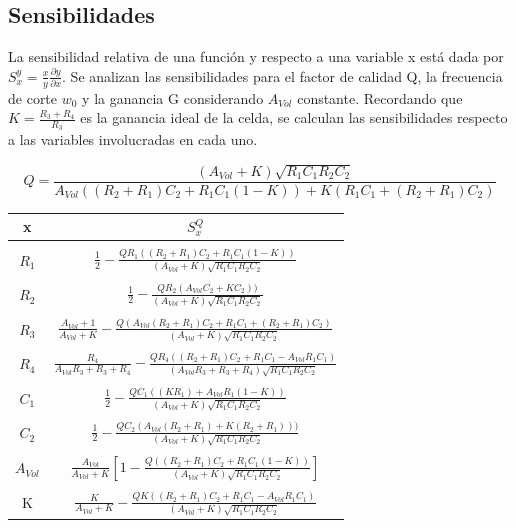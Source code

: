 \subsection{Sensibilidades}

La sensibilidad relativa de una función y respecto a una variable x está dada por $S^{y}_{x} = \frac{x}{y}\frac{\partial y}{\partial x}$. Se analizan las sensibilidades para el factor de calidad Q, la frecuencia de corte $w_{0}$ y la ganancia G considerando $A_{Vol}$ constante. Recordando que $K = \frac{R_{3}+R_{4}}{R_{3}}$ es la ganancia ideal de la celda, se calculan las sensibilidades respecto a las variables involucradas en cada uno. 

$$Q = \frac{(A_{Vol}+K)\sqrt{R_{1}C_{1}R_{2}C_{2}}}{A_{Vol}((R_{2}+R_{1})C_{2}+R_{1}C_{1}(1-K))+K(R_{1}C_{1}+(R_{2}+R_{1})C_{2})} $$

\begin{table}[H]
\centering
\begin{tabular}{c|c}
x         & $S^{Q}_{x}$                                                                                                                                             \\ \hline
\\
$R_{1}$   & $\frac{1}{2} - \frac{QR_{1}((R_{2}+R_{1})C_{2}+R_{1}C_{1}(1-K))}{(A_{Vol}+K)\sqrt{R_{1}C_{1}R_{2}C_{2}}}$           
\\
\\
$R_{2}$   & $\frac{1}{2} - \frac{QR_{2}(A_{Vol}C_{2}+KC_{2}))}{(A_{Vol}+K)\sqrt{R_{1}C_{1}R_{2}C_{2}}}$                                                  
\\
\\
$R_{3}$   & $\frac{A_{Vol}+1}{A_{Vol}+K} - \frac{Q(A_{Vol}(R_{2}+R_{1})C_{2}+R_{1}C_{1}+(R_{2}+R_{1})C_{2})}{(A_{Vol}+K)\sqrt{R_{1}C_{1}R_{2}C_{2}}}$
\\
\\
$R_{4}$   & $\frac{R_{4}}{A_{Vol}R_{3}+R_{3}+R_{4}} - \frac{QR_{4}((R_{2}+R_{1})C_{2}+R_{1}C_{1}-A_{Vol}R_{1}C_{1})}{(A_{Vol}R_{3}+R_{3}+R_{4})\sqrt{R_{1}C_{1}R_{2}C_{2}}}$
\\
\\
$C_{1}$   & $\frac{1}{2} - \frac{QC_{1}((KR_{1})+A_{Vol}R_{1}(1-K))}{(A_{Vol}+K)\sqrt{R_{1}C_{1}R_{2}C_{2}}}$
\\
\\
$C_{2}$   & $\frac{1}{2} - \frac{QC_{2}(A_{Vol}(R_{2}+R_{1})+K(R_{2}+R_{1})))}{(A_{Vol}+K)\sqrt{R_{1}C_{1}R_{2}C_{2}}}$
\\
\\
$A_{Vol}$ & $\frac{A_{Vol}}{A_{Vol}+K}\left [ 1 - \frac{Q((R_{2}+R_{1})C_{2}+R_{1}C_{1}(1-K))}{(A_{Vol}+K)\sqrt{R_{1}C_{1}R_{2}C_{2}}} \right ]$
\\
\\
K         & $\frac{K}{A_{Vol}+K} - \frac{QK((R_{2}+R_{1})C_{2}+R_{1}C_{1}-A_{Vol}R_{1}C_{1})}{(A_{Vol}+K)\sqrt{R_{1}C_{1}R_{2}C_{2}}}$  
\\
\end{tabular}
    \label{table:SQ}
\end{table}

